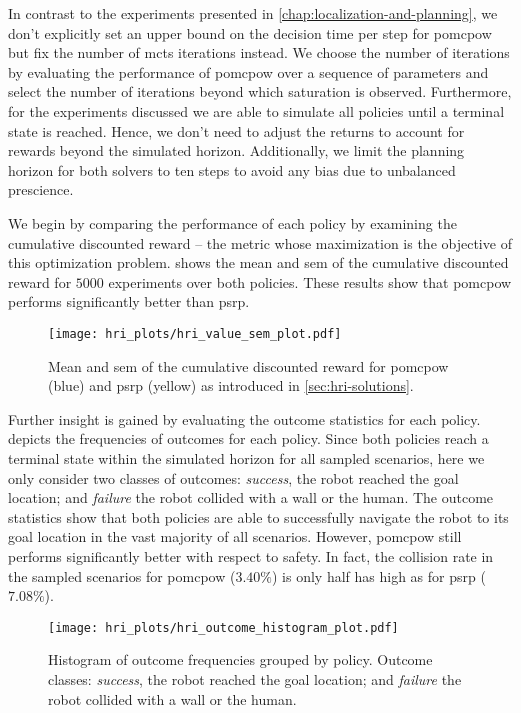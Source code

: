In contrast to the experiments presented in
\cref{chap:localization-and-planning}, we don't explicitly set an upper bound
on the decision time per step for \ac{pomcpow} but fix the number of
\ac{mcts} iterations instead. We choose the number of iterations by evaluating the
performance of \ac{pomcpow} over a sequence of parameters and select the number
of iterations beyond which saturation is observed. Furthermore, for the
experiments discussed we are able to simulate all policies until a terminal
state is reached. Hence, we don't need to adjust the returns to account for
rewards beyond the simulated horizon. Additionally, we limit the planning horizon
for both solvers to ten steps to avoid any bias due to unbalanced prescience.

We begin by comparing the performance of each policy by examining the
cumulative discounted reward -- the metric whose maximization is the objective
of this optimization problem.  shows the mean and
\ac{sem} of the cumulative discounted reward for $5000$ experiments over both
policies. These results show that \ac{pomcpow} performs significantly better
than \ac{psrp}.

\begin{figure}[htpb]
  \centering
  \texttt{[image: hri\_plots/hri\_value\_sem\_plot.pdf]}
  \caption{Mean and \acf{sem} of the cumulative discounted reward for
  \ac{pomcpow} (blue) and \ac{psrp} (yellow) as introduced in \cref{sec:hri-solutions}.}
  \label{fig:hri_eval_value_sem}
\end{figure}

Further insight is gained by evaluating the outcome statistics for each policy.
 depicts the frequencies of outcomes for each
policy. Since both policies reach a terminal state within the simulated horizon
for all sampled scenarios, here we only consider two classes of outcomes:
\emph{success}, the robot reached the goal location; and \emph{failure} the
robot collided with a wall or the human. The outcome statistics show that both
policies are able to successfully navigate the robot to its goal location in
the vast majority of all scenarios. However, \ac{pomcpow} still performs
significantly better with respect to safety. In fact, the collision rate in the
sampled scenarios for \ac{pomcpow} ($3.40\%$) is only half has high as for
\ac{psrp} ($7.08\%$).

\begin{figure}[H]
  \centering
  \texttt{[image: hri\_plots/hri\_outcome\_histogram\_plot.pdf]}
  \caption{Histogram of outcome frequencies grouped by policy. Outcome classes:
  \emph{success}, the robot reached the goal location; and \emph{failure} the
  robot collided with a wall or the human.}
  \label{fig:hri_outcome_histogram}
\end{figure}

